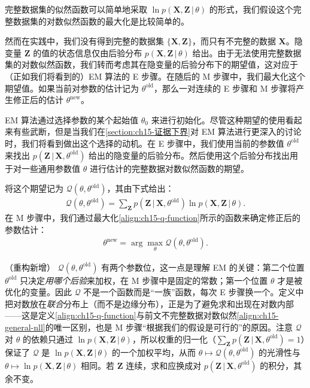 \documentclass[../../main.tex]{subfiles}
\begin{document}
完整数据集的似然函数可以简单地采取 $\ln p(\bm{X},\bm{Z}\,|\,\theta)$ 的形式，我们假设这个完整数据集的对数似然函数的最大化是比较简单的。

然而在实践中，我们没有得到完整的数据集 $\{\bm{X},\bm{Z}\}$，而只有不完整的数据 $\bm{X}$。隐变量 $\bm{Z}$ 的值的状态信息仅由后验分布 $p(\bm{X},\bm{Z}\,|\,\theta)$ 给出。由于无法使用完整数据集的对数似然函数，我们转而考虑其在隐变量的后验分布下的期望值，这对应于（正如我们将看到的）EM 算法的 E 步骤。在随后的 M 步骤中，我们最大化这个期望值。如果当前对参数的估计记为 $\theta^{\text{old}}$，那么一对连续的 E 步骤和 M 步骤将产生修正后的估计 $\theta^{\text{new}}$。

EM 算法通过选择参数的某个起始值 $\theta_0$ 来进行初始化。尽管这种期望的使用看起来有些武断，但是当我们在\cref{section:ch15-证据下界}对 EM 算法进行更深入的讨论时，我们将看到做出这个选择的动机。在 E 步骤中，我们使用当前的参数值 $\theta^{\text{old}}$ 来找出 $p(\bm{Z}\,|\,\bm{X},\theta^{\text{old}})$ 给出的隐变量的后验分布。然后使用这个后验分布找出用于对一些通用参数值 $\theta$ 进行估计的完整数据对数似然函数的期望。

\begin{definition}\label{definition:ch15-Q函数}
将这个期望记为 $\mathcal{Q}(\theta,\theta^{\text{old}})$，其由下式给出：
\begin{align}
\mathcal{Q}(\theta,\theta^{\text{old}})=\sum_{\bm{Z}}p(\bm{Z}\,|\,\bm{X},\theta^{\text{old}})\ln p(\bm{X},\bm{Z}\,|\,\theta).
\label{align:ch15-q-function}
\end{align}
在 M 步骤中，我们通过最大化\eqref{align:ch15-q-function}所示的函数来确定修正后的参数估计：
\begin{align}
\theta^{\text{new}}=\arg\max_{\theta}\mathcal{Q}(\theta,\theta^{\text{old}}).
\label{align:ch15-m-step}
\end{align}
\end{definition}

\begin{remark}（重构新增）
$\mathcal{Q}(\theta,\theta^{\text{old}})$ 有两个参数位，这一点是理解 EM 的关键：第二个位置 $\theta^{\text{old}}$ 只决定\emph{用哪个后验}来加权，在 M 步骤中是固定的常数；第一个位置 $\theta$ 才是被优化的变量。因此 $\mathcal{Q}$ 不是一个函数而是“一族”函数，每次 E 步骤换一个。定义中把对数放在\emph{联合}分布上（而不是边缘分布），正是为了避免求和出现在对数内部——这是定义\eqref{align:ch15-q-function}与前文不完整数据对数似然\eqref{align:ch15-general-nll}的唯一区别，也是 M 步骤“根据我们的假设是可行的”的原因。注意 $\mathcal{Q}$ 对 $\theta$ 的依赖只通过 $\ln p(\bm{X},\bm{Z}\,|\,\theta)$，所以权重的归一化（$\sum_{\bm{Z}}p(\bm{Z}\,|\,\bm{X},\theta^{\text{old}})=1$）保证了 $\mathcal{Q}$ 是 $\ln p(\bm{X},\bm{Z}\,|\,\theta)$ 的一个加权平均，从而 $\theta\mapsto\mathcal{Q}(\theta,\theta^{\text{old}})$ 的光滑性与 $\theta\mapsto\ln p(\bm{X},\bm{Z}\,|\,\theta)$ 相同。若 $\bm{Z}$ 连续，求和应换成对 $p(\bm{Z}\,|\,\bm{X},\theta^{\text{old}})$ 的积分，其余不变。
\end{remark}
\end{document}
